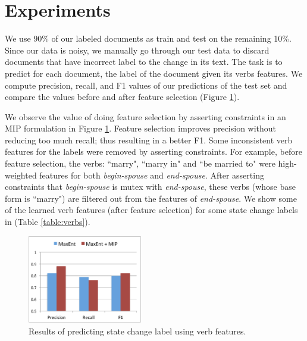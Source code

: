 \section{Experiments}

We use 90\% of our labeled documents as train and test on the remaining 10\%. Since our data is noisy, we manually go through our test data to discard documents that have incorrect label to the change in its text. The task is to predict for each document, the label of the document given its verbs features. We compute precision, recall, and F1 values of our predictions of the test set and compare the values before and after feature selection (Figure \ref{fig:result}).


We observe the value of doing feature selection by asserting constraints in an MIP formulation in Figure \ref{fig:result}. Feature selection improves precision without reducing too much recall; thus resulting in a better F1. Some inconsistent verb features for the labels were removed by asserting constraints. For example, before feature selection, the verbs: ``marry", ``marry in" and ``be married to" were high-weighted features for both \textit{begin-spouse} and \textit{end-spouse}. After asserting constraints that \textit{begin-spouse} is mutex with \textit{end-spouse}, these verbs (whose base form is ``marry") are filtered out from the features of \textit{end-spouse}. We show some of the learned verb features (after feature selection) for some state change labels in (Table \ref{table:verbs}).

\begin{figure}
\begin{center}
\includegraphics[width=5cm,keepaspectratio=true]{figures/result.pdf}
\caption{\label{fig:result} Results of predicting state change label using verb features.}
\end{center}
\end{figure}

